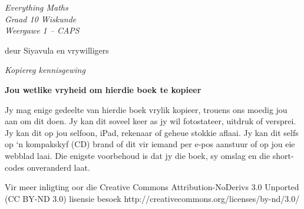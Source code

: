 

\begin{titlepage}
\begin{adjustwidth}{1in}{1in}
\begin{center}
    \thispagestyle{empty}

    \vspace*{4in}

    {\normalfont\sffamily\fontsize{36}\normalfont\itshape{Everything Maths } \\ \vspace*{1cm}
    {\normalfont\sffamily\fontsize{22}\normalfont\itshape{Graad 10 Wiskunde}}
    \vspace*{1in} \\
    \LARGE Weergawe 1 -- CAPS  \\

   {\vspace*{2in}
     deur Siyavula en vrywilligers 
  

\vfill

    }}
\end{center}
\end{adjustwidth}
\end{titlepage}






\newpage
\thispagestyle{empty}
{
\begin{center}
\normalfont\sffamily\fontsize{22}\normalfont\itshape  Kopiereg kennisgewing\\

\vspace*{1in}

\textbf{Jou wetlike vryheid om hierdie boek te kopieer}\\

\end{center}
}

{\large
Jy mag enige gedeelte van hierdie boek vrylik kopieer, trouens ons moedig jou aan om dit doen. Jy kan dit soveel keer as jy wil fotostateer, uitdruk of versprei. Jy kan dit op jou selfoon, iPad, rekenaar of geheue stokkie aflaai. Jy kan dit selfs op ‘n kompakskyf (CD) brand of dit vir iemand per e-pos aanstuur of op jou eie webblad laai.
Die enigste voorbehoud is dat jy die boek, sy omslag en die short-codes onveranderd laat. \par

Vir meer inligting oor die Creative Commons Attribution-NoDerivs 3.0 Unported (CC BY-ND
3.0) lisensie besoek http://creativecommons.org/licenses/by-nd/3.0/}\\


